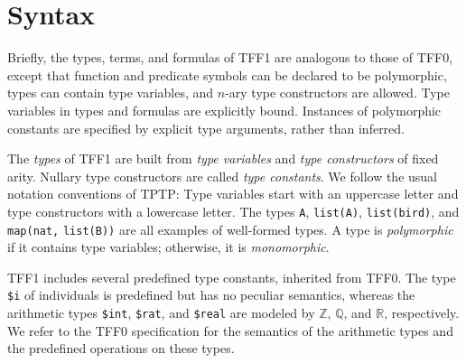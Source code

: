 
\section{Syntax} \label{sec_syntax}

Briefly, the types, terms, and formulas of TFF1 are analogous to those of TFF0,
except that function and predicate symbols can be declared to be polymorphic,
types can contain type variables, and $n$-ary type constructors are allowed.
Type variables in types and formulas are explicitly bound. Instances of
polymorphic constants are specified by explicit type arguments, rather than
inferred.

 The {\em types\/} of TFF1 are built from {\em type
variables\/} and {\em type constructors\/} of fixed arity. Nullary type
constructors are called {\em type constants}. We follow the usual notation
conventions of TPTP\@: Type variables start with an uppercase letter and type
constructors with a lowercase letter. The types \verb+A+, \verb+list(A)+,
\verb+list(bird)+, and \verb+map(nat,+ \verb+list(B))+ are all examples of
well-formed types. A type is {\em polymorphic} if it contains type variables;
otherwise, it is {\em monomorphic}.


TFF1 includes several predefined type constants, inherited from TFF0.
The type {\tt \$i} %
of individuals is predefined but has no peculiar semantics, whereas the
arithmetic types
{\tt \$int}, {\tt \$rat}, and {\tt \$real} are modeled by $\mathbb{Z}$,
$\mathbb{Q}$, and $\mathbb{R}$, respectively. We refer
to the TFF0 specification \cite{TFF0} for the semantics of
the arithmetic types and the predefined operations on
these types. %

